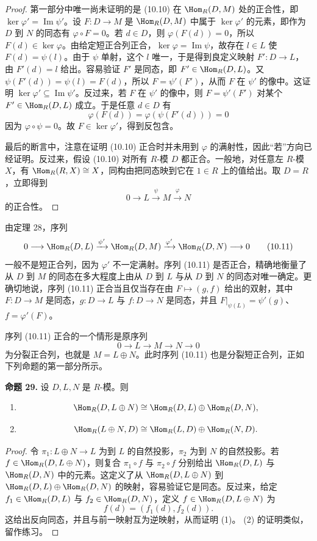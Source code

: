 \begin{proof}
第一部分中唯一尚未证明的是 (10.10) 在 $\Hom_R(D,M)$ 处的正合性，即 $\ker\varphi'=\operatorname{Im}\psi'$。设 $F:D\to M$ 是 $\Hom_R(D,M)$ 中属于 $\ker\varphi'$ 的元素，即作为 $D$ 到 $N$ 的同态有 $\varphi\circ F=0$。若 $d\in D$，则 $\varphi(F(d))=0$，所以 $F(d)\in\ker\varphi$。由给定短正合列正合，$\ker\varphi=\operatorname{Im}\psi$，故存在 $l\in L$ 使 $F(d)=\psi(l)$。由于 $\psi$ 单射，这个 $l$ 唯一，于是得到良定义映射 $F':D\to L$，由 $F'(d)=l$ 给出。容易验证 $F'$ 是同态，即 $F'\in\Hom_R(D,L)$。又 $\psi(F'(d))=\psi(l)=F(d)$，所以 $F=\psi'(F')$，从而 $F$ 在 $\psi'$ 的像中。这证明 $\ker\varphi'\subseteq\operatorname{Im}\psi'$。反过来，若 $F$ 在 $\psi'$ 的像中，则 $F=\psi'(F')$ 对某个 $F'\in\Hom_R(D,L)$ 成立。于是任意 $d\in D$ 有
\[
\varphi(F(d))=\varphi(\psi(F'(d)))=0
\]
因为 $\varphi\circ\psi=0$。故 $F\in\ker\varphi'$，得到反包含。

最后的断言中，注意在证明 (10.10) 正合时并未用到 $\varphi$ 的满射性，因此“若”方向已经证明。反过来，假设 (10.10) 对所有 $R$-模 $D$ 都正合。一般地，对任意左 $R$-模 $X$，有 $\Hom_R(R,X)\cong X$，同构由把同态映到它在 $1\in R$ 上的值给出。取 $D=R$，立即得到
\[
0\longrightarrow L\xrightarrow{\psi}M\xrightarrow{\varphi}N
\]
的正合性。
\end{proof}

由定理 28，序列
\[
0\longrightarrow \Hom_R(D,L)\xrightarrow{\psi'}\Hom_R(D,M)\xrightarrow{\varphi'}\Hom_R(D,N)\longrightarrow0
\tag{10.11}
\]
一般不是短正合列，因为 $\varphi'$ 不一定满射。序列 (10.11) 是否正合，精确地衡量了从 $D$ 到 $M$ 的同态在多大程度上由从 $D$ 到 $L$ 与从 $D$ 到 $N$ 的同态对唯一确定。更确切地说，序列 (10.11) 正合当且仅当存在由 $F\mapsto(g,f)$ 给出的双射，其中 $F:D\to M$ 是同态，$g:D\to L$ 与 $f:D\to N$ 是同态，并且 $F|_{\psi(L)}=\psi'(g)$、$f=\varphi'(F)$。

序列 (10.11) 正合的一个情形是原序列
\[
0\longrightarrow L\longrightarrow M\longrightarrow N\longrightarrow0
\]
为分裂正合列，也就是 $M=L\oplus N$。此时序列 (10.11) 也是分裂短正合列，正如下列命题的第一部分所示。

\noindent\textbf{命题 29.} 设 $D,L,N$ 是 $R$-模。则
\begin{enumerate}[label=(\arabic*)]
\item
\[
\Hom_R(D,L\oplus N)\cong\Hom_R(D,L)\oplus\Hom_R(D,N),
\]
\item
\[
\Hom_R(L\oplus N,D)\cong\Hom_R(L,D)\oplus\Hom_R(N,D).
\]
\end{enumerate}

\begin{proof}
令 $\pi_1:L\oplus N\to L$ 为到 $L$ 的自然投影，$\pi_2$ 为到 $N$ 的自然投影。若 $f\in\Hom_R(D,L\oplus N)$，则复合 $\pi_1\circ f$ 与 $\pi_2\circ f$ 分别给出 $\Hom_R(D,L)$ 与 $\Hom_R(D,N)$ 中的元素。这定义了从 $\Hom_R(D,L\oplus N)$ 到 $\Hom_R(D,L)\oplus\Hom_R(D,N)$ 的映射，容易验证它是同态。反过来，给定 $f_1\in\Hom_R(D,L)$ 与 $f_2\in\Hom_R(D,N)$，定义 $f\in\Hom_R(D,L\oplus N)$ 为
\[
f(d)=(f_1(d),f_2(d)).
\]
这给出反向同态，并且与前一映射互为逆映射，从而证明 (1)。 (2) 的证明类似，留作练习。
\end{proof}

